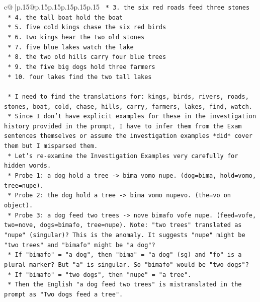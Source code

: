 \documentclass{article}
\begin{document}
{\begin{supertabular}{c@{$\;$}|p{.15\linewidth}@{}p{.15\linewidth}p{.15\linewidth}p{.15\linewidth}p{.15\linewidth}p{.15\linewidth}}
{{{\texttt{                *   3. the six red roads feed three stones} \\
\texttt{                *   4. the tall boat hold the boat} \\
\texttt{                *   5. five cold kings chase the six red birds} \\
\texttt{                *   6. two kings hear the two old stones} \\
\texttt{                *   7. five blue lakes watch the lake} \\
\texttt{                *   8. the two old hills carry four blue trees} \\
\texttt{                *   9. the five big dogs hold three farmers} \\
\texttt{                *   10. four lakes find the two tall lakes} \\
\\ 
\texttt{    *   I need to find the translations for: kings, birds, rivers, roads, stones, boat, cold, chase, hills, carry, farmers, lakes, find, watch.} \\
\texttt{    *   Since I don't have explicit examples for these in the investigation history provided in the prompt, I have to infer them from the Exam sentences themselves or assume the investigation examples *did* cover them but I misparsed them.} \\
\texttt{    *   Let's re{-}examine the Investigation Examples very carefully for hidden words.} \\
\texttt{        *   Probe 1: a dog hold a tree {-}> bima vomo nupe. (dog=bima, hold=vomo, tree=nupe).} \\
\texttt{        *   Probe 2: the dog hold a tree {-}> bima vomo nupevo. (the=vo on object).} \\
\texttt{        *   Probe 3: a dog feed two trees {-}> nove bimafo vofe nupe. (feed=vofe, two=nove, dogs=bimafo, tree=nupe). Note: "two trees" translated as "nupe" (singular)? This is the anomaly. It suggests "nupe" might be "two trees" and "bimafo" might be "a dog"?} \\
\texttt{            *   If "bimafo" = "a dog", then "bima" = "a dog" (sg) and "fo" is a plural marker? But "a" is singular. So "bimafo" would be "two dogs"?} \\
\texttt{            *   If "bimafo" = "two dogs", then "nupe" = "a tree".} \\
\texttt{            *   Then the English "a dog feed two trees" is mistranslated in the prompt as "Two dogs feed a tree".} \\
}}}
\end{supertabular}}
\end{document}
